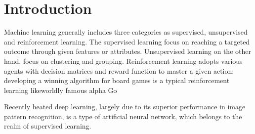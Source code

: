 \section{Introduction}

Machine learning generally includes three categories as supervised, unsupervised and reinforcement learning. The supervised learning focus on reaching a targeted outcome through given features or attributes. Unsupervised learning on the other hand, focus on clustering and grouping. Reinforcement learning adopts various agents with decision matrices and reward function to master a given action; developing a winning algorithm for board games is a typical reinforcement learning likeworldly famous alpha Go
\par
Recently heated deep learning, largely due to its superior performance in image pattern recognition, is a type of artificial neural network, which belongs to the realm of supervised learning. 
